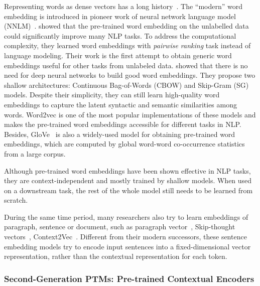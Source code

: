 \documentclass[fleqn]{SCYE-arxiv}
\begin{document}
\begin{multicols}{2}
Representing words as dense vectors has a long history~\cite{hinton1986distributed}. The ``modern'' word embedding is introduced in pioneer work of neural network language model (NNLM)~\cite{bengio2003neural}.
\citet{DBLP:journals/jmlr/CollobertWBKKK11} showed that the pre-trained word embedding on the unlabelled data could significantly improve many NLP tasks. To address the computational complexity, they learned word embeddings with \textit{pairwise ranking} task instead of language modeling.
Their work is the first attempt to obtain generic word embeddings useful for other tasks from unlabeled data.
\citet{mikolov2013word2vec} showed that there is no need for deep neural networks to build good word embeddings. They propose two shallow architectures: Continuous Bag-of-Words (CBOW) and Skip-Gram (SG) models.
Despite their simplicity, they can still learn high-quality word embeddings to capture the latent syntactic and semantic similarities among words.
Word2vec is one of the most popular implementations of these models and makes the pre-trained word embeddings accessible for different tasks in NLP.
Besides, GloVe~\cite{DBLP:conf/emnlp/PenningtonSM14} is also a widely-used model for obtaining pre-trained word embeddings, which are computed by global word-word co-occurrence statistics from a large corpus.

Although pre-trained word embeddings have been shown effective in NLP tasks, they are context-independent and mostly trained by shallow models. When used on a downstream task, the rest of the whole model still needs to be learned from scratch.

During the same time period, many researchers also try to learn embeddings of paragraph, sentence or document, such as paragraph vector~\cite{le2014distributed}, Skip-thought vectors~\cite{kiros2015skip}, Context2Vec~\cite{melamud-etal-2016-context2vec}.
Different from their modern successors, these sentence embedding models try to encode input sentences into a fixed-dimensional vector representation, rather than the contextual representation for each token.


\subsubsection{Second-Generation PTMs: Pre-trained Contextual Encoders}





\end{multicols}
\end{document}
